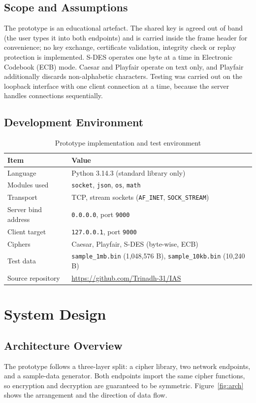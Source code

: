 \section{Scope and Assumptions}
The prototype is an educational artefact. The shared key is agreed out of band
(the user types it into both endpoints) and is carried inside the frame header for
convenience; no key exchange, certificate validation, integrity check or replay
protection is implemented. S-DES operates one byte at a time in Electronic
Codebook (ECB) mode. Caesar and Playfair operate on text only, and Playfair
additionally discards non-alphabetic characters. Testing was carried out on the
loopback interface with one client connection at a time, because the server
handles connections sequentially.

\section{Development Environment}
\begin{table}[!ht]
\centering
\caption{Prototype implementation and test environment}
\label{tab:env}
\begin{tabular}{|l|l|}
\hline
\textbf{Item} & \textbf{Value} \\ \hline
Language & Python 3.14.3 (standard library only) \\ \hline
Modules used & \texttt{socket}, \texttt{json}, \texttt{os}, \texttt{math} \\ \hline
Transport & TCP, stream sockets (\texttt{AF\_INET}, \texttt{SOCK\_STREAM}) \\ \hline
Server bind address & \texttt{0.0.0.0}, port \texttt{9000} \\ \hline
Client target & \texttt{127.0.0.1}, port \texttt{9000} \\ \hline
Ciphers & Caesar, Playfair, S-DES (byte-wise, ECB) \\ \hline
Test data & \texttt{sample\_1mb.bin} (1{,}048{,}576 B), \texttt{sample\_10kb.bin} (10{,}240 B) \\ \hline
Source repository & \url{https://github.com/Trinadh-31/IAS} \\ \hline
\end{tabular}
\end{table}

\chapter{System Design}

\section{Architecture Overview}
The prototype follows a three-layer split: a cipher library, two network
endpoints, and a sample-data generator. Both endpoints import the same cipher
functions, so encryption and decryption are guaranteed to be symmetric.
Figure~\ref{fig:arch} shows the arrangement and the direction of data flow.

